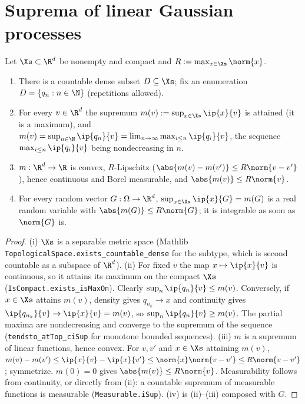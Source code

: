 \section{Suprema of linear Gaussian processes}
\label{sec:pre_gaussian_sup}

\begin{lemma}
\label{lem:sup_countable_dense}
\leanok
Let $\Xs \subset \R^d$ be nonempty and compact and $R := \max_{x\in\Xs}\norm{x}$.
\begin{enumerate}
  \item[(i)] There is a countable dense subset $D \subseteq \Xs$; fix an enumeration
        $D = \{q_n : n \in \N\}$ (repetitions allowed).
  \item[(ii)] For every $v \in \R^d$ the supremum $m(v) := \sup_{x\in\Xs}\ip{x}{v}$ is
        attained (it is a maximum), and
        $m(v) = \sup_{n\in\N}\ip{q_n}{v} = \lim_{n\to\infty}\max_{i\le n}\ip{q_i}{v}$,
        the sequence $\max_{i\le n}\ip{q_i}{v}$ being nondecreasing in $n$.
  \item[(iii)] $m : \R^d \to \R$ is convex, $R$-Lipschitz ($\abs{m(v) - m(v')} \le R\norm{v - v'}$),
        hence continuous and Borel measurable, and $\abs{m(v)} \le R\norm{v}$.
  \item[(iv)] For every random vector $G : \Omega \to \R^d$, $\sup_{x\in\Xs}\ip{x}{G} = m(G)$ is
        a real random variable with $\abs{m(G)} \le R\norm{G}$; it is integrable as soon as
        $\norm{G}$ is.
\end{enumerate}
\end{lemma}

\begin{proof}
\leanok
(i) $\Xs$ is a separable metric space (Mathlib \texttt{TopologicalSpace.exists\_countable\_dense}
for the subtype, which is second countable as a subspace of $\R^d$). (ii) For fixed $v$ the
map $x \mapsto \ip{x}{v}$ is continuous, so it attains its maximum on the compact $\Xs$
(\texttt{IsCompact.exists\_isMaxOn}). Clearly $\sup_{n}\ip{q_n}{v} \le m(v)$. Conversely, if
$x \in \Xs$ attains $m(v)$, density gives $q_{n_k} \to x$ and continuity gives
$\ip{q_{n_k}}{v} \to \ip{x}{v} = m(v)$, so $\sup_n\ip{q_n}{v} \ge m(v)$. The partial maxima are
nondecreasing and converge to the supremum of the sequence
(\texttt{tendsto\_atTop\_ciSup} for monotone bounded sequences). (iii) $m$ is a supremum of
linear functions, hence convex. For $v, v'$ and $x \in \Xs$ attaining $m(v)$,
$m(v) - m(v') \le \ip{x}{v} - \ip{x}{v'} \le \norm{x}\norm{v-v'} \le R\norm{v-v'}$; symmetrize.
$m(0) = 0$ gives $\abs{m(v)} \le R\norm{v}$. Measurability follows from continuity, or
directly from (ii): a countable supremum of measurable functions is measurable
(\texttt{Measurable.iSup}). (iv) is (ii)--(iii) composed with $G$.
\end{proof}

